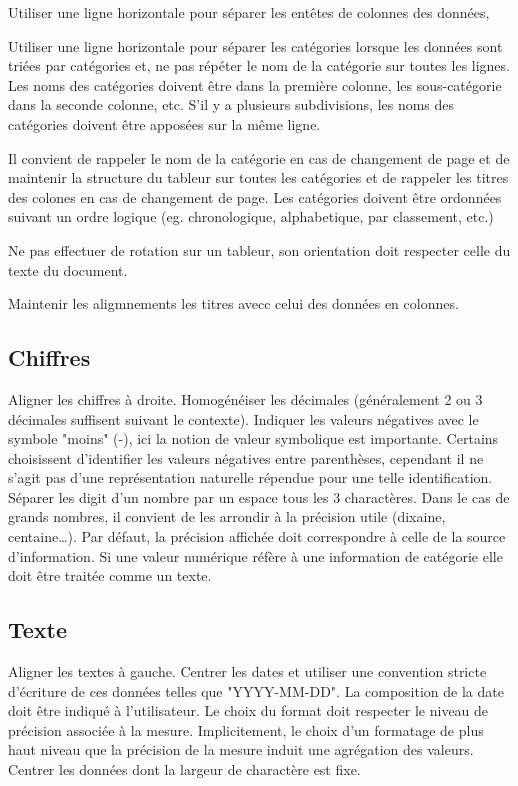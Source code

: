 \documentclass[a4paper,12pt]{article}
\begin{document}
\begin{multicols}{2}
Utiliser une ligne horizontale pour séparer les entêtes de colonnes des données,

Utiliser une ligne horizontale pour séparer les catégories lorsque les données sont triées par catégories et, ne pas répéter le nom de la catégorie sur toutes les lignes. Les noms des catégories doivent être dans la première colonne, les sous-catégorie dans la seconde colonne, etc. S'il y a plusieurs subdivisions, les noms des catégories doivent être apposées sur la même ligne.

Il convient de rappeler le nom de la catégorie en cas de changement de page et de maintenir la structure du tableur sur toutes les catégories et de rappeler les titres des colones en cas de changement de page.
Les catégories doivent être ordonnées suivant un ordre logique (eg. chronologique, alphabetique, par classement, etc.)

Ne pas effectuer de rotation sur un tableur, son orientation doit respecter celle du texte du document.

Maintenir les aligmnements les titres avecc celui des données en colonnes.
\subsection*{Chiffres}
\label{sec:orgcf6f942}
Aligner les chiffres à droite.
Homogénéiser les décimales (généralement 2 ou 3 décimales suffisent suivant le contexte).
Indiquer les valeurs négatives avec le symbole "moins" (-), ici la notion de valeur symbolique est importante. Certains choisissent d'identifier les valeurs négatives entre parenthèses, cependant il ne s'agit pas d'une représentation naturelle répendue pour une telle identification.
Séparer les digit d'un nombre par un espace tous les 3 charactères. Dans le cas de grands nombres, il convient de les arrondir à la précision utile (dixaine, centaine\ldots{}). Par défaut, la précision affichée doit correspondre à celle de la source d'information.
Si une valeur numérique réfère à une information de catégorie elle doit être traitée comme un texte.
\subsection*{Texte}
\label{sec:org8617665}
Aligner les textes à gauche.
Centrer les dates et utiliser une convention stricte d'écriture de ces données telles que "YYYY-MM-DD". \autocite{ISO8601-1DateHeureRepresentations2019} La composition de la date doit être indiqué à l'utilisateur. Le choix du format doit respecter le niveau de précision associée à la mesure. Implicitement, le choix d'un formatage de plus haut niveau que la précision de la mesure induit une agrégation des valeurs.
Centrer les données dont la largeur de charactère est fixe.

\end{multicols}
\end{document}
